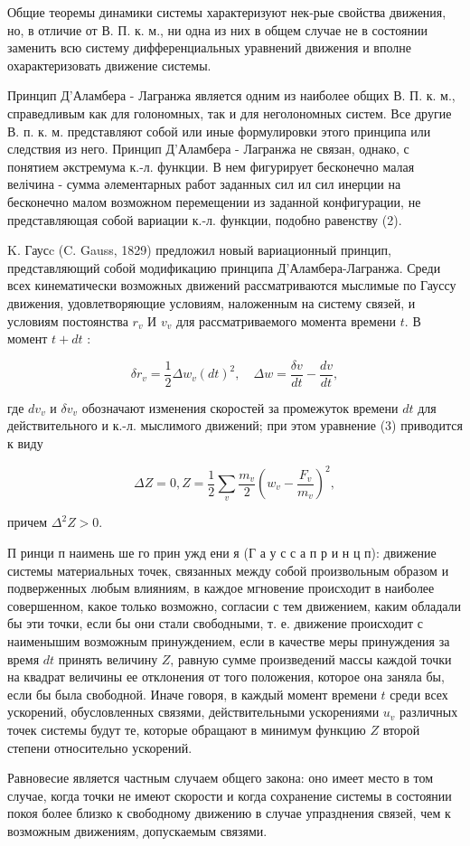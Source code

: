 \documentclass[10pt]{article}
\begin{document}
Общие теоремы динамики системы характеризуют нек-рые свойства движения, но, в отличие от В. П. к. м., ни одна из них в общем случае не в состоянии заменить всю систему дифференциальных уравнений движения и вполне охарактеризовать движение системы.



Принцип Д'Аламбера - Лагранжа является одним из наиболее общих В. П. к. м., справедливым как для голономных, так и для неголономных систем. Все другие В. п. к. м. представляют собой или иные формулировки этого принципа или следствия из него. Принцип Д'Аламбера - Лагранжа не связан, однако, с понятием әкстремума к.-л. функции. В нем фигурирует бесконечно малая велічина - сумма әлементарных работ заданных сил ил сил инерции на бесконечно малом возможном перемещении из заданной конфигурации, не представляющая собой вариации к.-л. функции, подобно равенству (2).



K. Гаусc (C. Gauss, 1829) предложил новый вариационный принцип, представляющий собой модификацию принципа Д'Аламбера-Лагранжа. Среди всех кинематически возможных движений рассматриваются мыслимые по Гауссу движения, удовлетворяющие условиям, наложенным на систему связей, и условиям постоянства $r_{v}$ И $v_{v}$ для рассматриваемого момента времени $t$. В момент $t+d t$ :



\[

\delta r_{v}=\frac{1}{2} \Delta w_{v}(d t)^{2}, \quad \Delta w=\frac{\delta v}{d t}-\frac{d v}{d t},

\]



где $d v_{v}$ и $\delta v_{v}$ обозначают изменения скоростей за промежуток времени $d t$ для действительного и к.-л. мыслимого движений; при этом уравнение (3) приводится к виду



\[

\Delta Z=0, Z=\frac{1}{2} \sum_{v} \frac{m_{v}}{2}\left(w_{v}-\frac{F_{v}}{m_{v}}\right)^{2},

\]



причем $\Delta^{2} Z>0$.



П ринци п наимень ше го прин ужд ени я (Г а у с с а п р и н ц п): движение системы материальных точек, связанных между собой произвольным образом и подверженных любым влияниям, в каждое мгновение происходит в наиболее совершенном, какое только возможно, согласии с тем движением, каким обладали бы эти точки, если бы они стали свободными, т. е. движение происходит с наименышим возможным принуждением, если в качестве меры принуждения за время $d t$ принять величину $Z$, равную сумме произведений массы каждой точки на квадрат величины ее отклонения от того положения, которое она заняла бы, если бы была свободной. Иначе говоря, в каждый момент времени $t$ среди всех ускорений, обусловленных связями, действительными ускорениями $u_{v}$ различных точек системы будут те, которые обращают в минимум функцию $Z$ второй степени относительно ускорений.



Равновесие является частным случаем общего закона: оно имеет место в том случае, когда точки не имеют скорости и когда сохранение системы в состоянии покоя более близко к свободному движению в случае упразднения связей, чем к возможным движениям, допускаемым связями.
\end{document}
